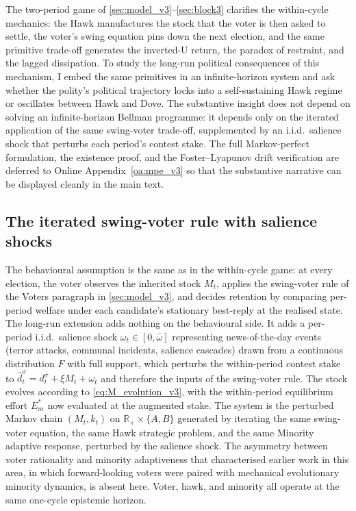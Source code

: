 \documentclass[11pt,twoside]{extarticle}
\begin{document}
The two-period game of \autoref{sec:model_v3}--\autoref{sec:block3} clarifies the within-cycle mechanics: the Hawk manufactures the stock that the voter is then asked to settle, the voter's swing equation pins down the next election, and the same primitive trade-off generates the inverted-U return, the paradox of restraint, and the lagged dissipation. To study the long-run political consequences of this mechanism, I embed the same primitives in an infinite-horizon system and ask whether the polity's political trajectory locks into a self-sustaining Hawk regime or oscillates between Hawk and Dove. The substantive insight does not depend on solving an infinite-horizon Bellman programme: it depends only on the iterated application of the same swing-voter trade-off, supplemented by an i.i.d.\ salience shock that perturbs each period's contest stake. The full Markov-perfect formulation, the existence proof, and the Foster--Lyapunov drift verification are deferred to Online Appendix~\ref{oa:mpe_v3} so that the substantive narrative can be displayed cleanly in the main text.

\subsection{The iterated swing-voter rule with salience shocks}\label{subsec:behaviour_long_v3}

The behavioural assumption is the same as in the within-cycle game: at every election, the voter observes the inherited stock $M_t$, applies the swing-voter rule of the Voters paragraph in \autoref{sec:model_v3}, and decides retention by comparing per-period welfare under each candidate's stationary best-reply at the realised state. The long-run extension adds nothing on the behavioural side. It adds a per-period i.i.d.\ salience shock $\omega_t\in[0,\bar\omega]$ representing news-of-the-day events (terror attacks, communal incidents, salience cascades) drawn from a continuous distribution $F$ with full support, which perturbs the within-period contest stake to $\hat d_t^\sigma=d_t^\sigma+\xi M_t+\omega_t$ and therefore the inputs of the swing-voter rule. The stock evolves according to \autoref{eq:M_evolution_v3}, with the within-period equilibrium effort $E_m^*$ now evaluated at the augmented stake. The system is the perturbed Markov chain $(M_t,k_t)$ on $\mathbb R_+\times\{A,B\}$ generated by iterating the same swing-voter equation, the same Hawk strategic problem, and the same Minority adaptive response, perturbed by the salience shock. The asymmetry between voter rationality and minority adaptiveness that characterised earlier work in this area, in which forward-looking voters were paired with mechanical evolutionary minority dynamics, is absent here. Voter, hawk, and minority all operate at the same one-cycle epistemic horizon.
\end{document}
